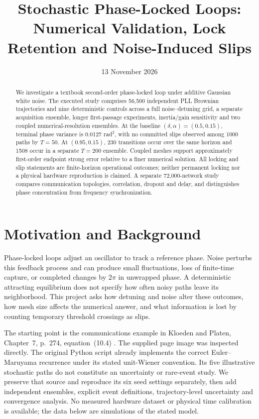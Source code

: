 \documentclass[11pt,a4paper]{article}
\title{Stochastic Phase-Locked Loops:\\Numerical Validation, Lock Retention and Noise-Induced Slips}
\author{}
\date{13 November 2026}
\begin{document}
\maketitle
\begin{abstract}
We investigate a textbook second-order phase-locked loop under additive Gaussian white noise. The executed study comprises 56,500 independent PLL Brownian trajectories and nine deterministic controls across a full noise--detuning grid, a separate acquisition ensemble, longer first-passage experiments, inertia/gain sensitivity and two coupled numerical-resolution ensembles. At the baseline $(\delta,\alpha)=(0.5,0.15)$, terminal phase variance is 0.0127 rad$^2$, with no committed slips observed among 1000 paths by $T=50$. At $(0.95,0.15)$, 230 transitions occur over the same horizon and 1508 occur in a separate $T=200$ ensemble. Coupled meshes support approximately first-order endpoint strong error relative to a finer numerical solution. All locking and slip statements are finite-horizon operational outcomes; neither permanent locking nor a physical hardware reproduction is claimed.
A separate 72,000-network study compares communication topologies, correlation, dropout and delay, and distinguishes phase concentration from frequency synchronization.
\end{abstract}

\section{Motivation and Background}
Phase-locked loops adjust an oscillator to track a reference phase. Noise perturbs this feedback process and can produce small fluctuations, loss of finite-time capture, or completed changes by $2\pi$ in unwrapped phase. A deterministic attracting equilibrium does not specify how often noisy paths leave its neighborhood. This project asks how detuning and noise alter these outcomes, how mesh size affects the numerical answer, and what information is lost by counting temporary threshold crossings as slips.

The starting point is the communications example in Kloeden and Platen, Chapter~7, p.~274, equation~(10.4) \cite{kloeden1992}. The supplied page image was inspected directly. The original Python script already implements the correct Euler--Maruyama recurrence under its stated unit-Wiener convention. Its five illustrative stochastic paths do not constitute an uncertainty or rare-event study. We preserve that source and reproduce its six seed settings separately, then add independent ensembles, explicit event definitions, trajectory-level uncertainty and convergence analysis. No measured hardware dataset or physical time calibration is available; the data below are simulations of the stated model.
\end{document}
